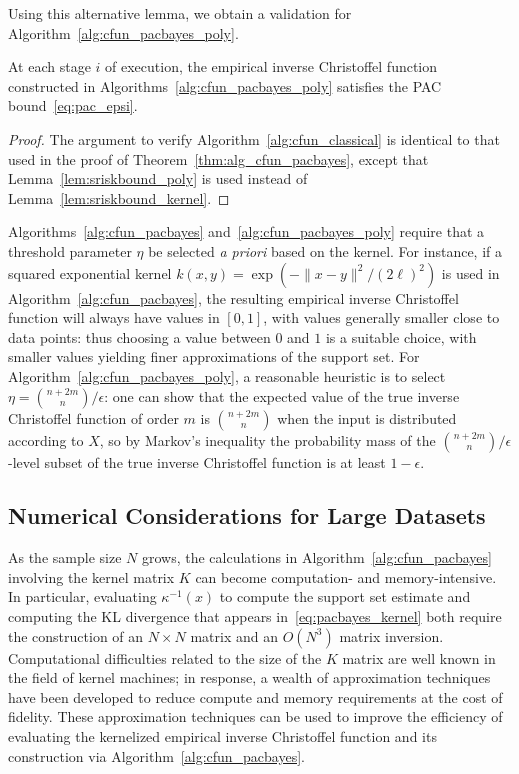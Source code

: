 \documentclass[onefignum,onetabnum]{siamart171218}
\begin{document}
Using this alternative lemma, we obtain a validation for
Algorithm~\ref{alg:cfun_pacbayes_poly}.
\begin{corollary}
    \label{cor:alg_cfun_pacbayes_poly}
    At each stage $i$ of execution, the empirical inverse Christoffel function
    constructed in Algorithms~\ref{alg:cfun_pacbayes_poly} satisfies the PAC
    bound~\eqref{eq:pac_epsi}.
\end{corollary}
\begin{proof}
    The argument to verify Algorithm~\ref{alg:cfun_classical} is identical to
    that used in the proof of Theorem~\ref{thm:alg_cfun_pacbayes}, except that
    Lemma~\ref{lem:sriskbound_poly} is used instead of
    Lemma~\ref{lem:sriskbound_kernel}.
\end{proof}

\begin{remark}
    \label{rmk:thresholds}
    Algorithms~\ref{alg:cfun_pacbayes} and~\ref{alg:cfun_pacbayes_poly} require
    that a threshold parameter $\eta$ be selected \emph{a priori} based on the
    kernel.
    For instance, if a squared exponential kernel
    $k(x,y)=\exp(-\|x-y\|^2/(2\ell)^2)$ is used in
    Algorithm~\ref{alg:cfun_pacbayes}, the resulting empirical inverse
    Christoffel function will always have values in $[0,1]$, with values
    generally smaller close to data points: thus choosing a value between $0$
    and $1$ is a suitable choice, with smaller values yielding finer
    approximations of the support set. For
    Algorithm~\ref{alg:cfun_pacbayes_poly}, a reasonable heuristic is to select
    $\eta=\binom{n+2m}{n}/\epsilon$: one can show that the expected
    value of the true inverse Christoffel function of order $m$ is
    $\binom{n+2m}{n}$ when the input is distributed according to $X$, so by
    Markov's inequality the probability mass of the
    $\binom{n+2m}{n}/\epsilon$-level subset of the true inverse Christoffel
    function is at least $1-\epsilon$.
\end{remark}

\subsection{Numerical Considerations for Large Datasets}%
\label{sub:numerical_considerations_for_large_datasets}

As the sample size $N$ grows, the calculations in
Algorithm~\ref{alg:cfun_pacbayes} involving the kernel matrix $K$ can become
computation- and memory-intensive. 
In particular,
evaluating $\kappa^{-1}(x)$
to compute the support set estimate and 
computing the KL divergence
that appears in~\eqref{eq:pacbayes_kernel}
both require the construction of an $N\times N$ matrix
and an $O(N^3)$ matrix inversion.
Computational difficulties related to the size of the $K$ matrix
are well known in the field of kernel machines; in response,
a wealth of approximation techniques have been developed to reduce compute and
memory requirements at the cost of fidelity. These approximation techniques can
be used to improve the efficiency of evaluating the kernelized empirical inverse
Christoffel function and its construction via Algorithm~\ref{alg:cfun_pacbayes}.
\end{document}
